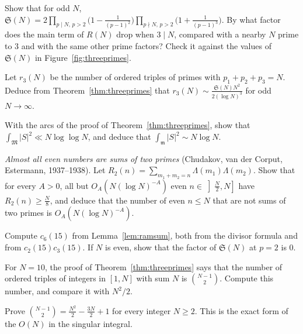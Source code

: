 \begin{exercise}[$\star$]\label{ex:sing3}
Show that for odd $N$, $\mathfrak S(N)=2\prod_{p\mid N,\,p>2}\bigl(1-\frac1{(p-1)^2}\bigr)\prod_{p\nmid N,\,p>2}\bigl(1+\frac1{(p-1)^3}\bigr)$. By what factor does the main term of $R(N)$ drop when $3\mid N$, compared with a nearby $N$ prime to $3$ and with the same other prime factors? Check it against the values of $\mathfrak S(N)$ in Figure~\ref{fig:threeprimes}.
\end{exercise}
\begin{exercise}[$\star\star$]\label{ex:r3count}
Let $r_3(N)$ be the number of ordered triples of primes with $p_1+p_2+p_3=N$. Deduce from Theorem~\ref{thm:threeprimes} that $r_3(N)\sim\frac{\mathfrak S(N)N^2}{2(\log N)^3}$ for odd $N\to\infty$.
\end{exercise}
\begin{exercise}[$\star\star$]\label{ex:binary}
With the arcs of the proof of Theorem~\ref{thm:threeprimes}, show that $\int_{\mathfrak M}|S|^2\ll N\log\log N$, and deduce that $\int_{\mathfrak m}|S|^2\sim N\log N$.
\end{exercise}
\begin{exercise}[$\star\star\star$]\label{ex:almostall}
\emph{Almost all even numbers are sums of two primes} (Chudakov, van der Corput, Estermann, 1937--1938). Let $R_2(n)=\sum_{m_1+m_2=n}\Lambda(m_1)\Lambda(m_2)$. Show that for every $A>0$, all but $O_A(N(\log N)^{-A})$ even $n\in\left]\frac N2,N\right]$ have $R_2(n)\ge\frac N8$, and deduce that the number of even $n\le N$ that are not sums of two primes is $O_A(N(\log N)^{-A})$.
\end{exercise}
\begin{exercise}[$\star$]\label{ex:v14-extra-07-1}
Compute $c_6(15)$ from Lemma~\ref{lem:ramsum}, both from the divisor formula and from $c_2(15)c_3(15)$. If $N$ is even, show that the factor of $\mathfrak S(N)$ at $p=2$ is $0$.
\end{exercise}

\begin{exercise}[$\star$]\label{ex:v14-extra-07-2}
For $N=10$, the proof of Theorem~\ref{thm:threeprimes} says that the number of ordered triples of integers in $[1,N]$ with sum $N$ is $\binom{N-1}2$. Compute this number, and compare it with $N^2/2$.
\end{exercise}

\begin{exercise}[$\star$]\label{ex:v14-extra-07-3}
Prove $\binom{N-1}2=\frac{N^2}2-\frac{3N}2+1$ for every integer $N\ge2$. This is the exact form of the $O(N)$ in the singular integral.
\end{exercise}

